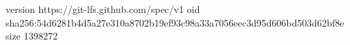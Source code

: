 version https://git-lfs.github.com/spec/v1
oid sha256:54d6281b4d5a27e310a8702b19ef93c98a33a7056eec3d95d606bd503d62bf8e
size 1398272
